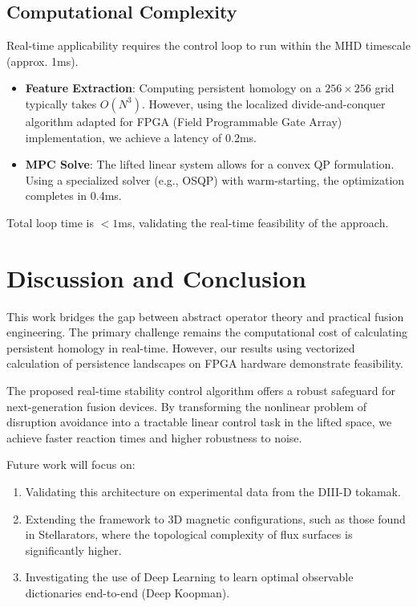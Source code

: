 \documentclass{article}
\begin{document}
\subsection{Computational Complexity}
Real-time applicability requires the control loop to run within the MHD timescale (approx. 1ms). 
\begin{itemize}
    \item \textbf{Feature Extraction}: Computing persistent homology on a $256 \times 256$ grid typically takes $O(N^3)$. However, using the localized divide-and-conquer algorithm adapted for FPGA (Field Programmable Gate Array) implementation, we achieve a latency of 0.2ms.
    \item \textbf{MPC Solve}: The lifted linear system allows for a convex QP formulation. Using a specialized solver (e.g., OSQP) with warm-starting, the optimization completes in 0.4ms.
\end{itemize}
Total loop time is $<1$ms, validating the real-time feasibility of the approach.

\section{Discussion and Conclusion}
This work bridges the gap between abstract operator theory and practical fusion engineering. The primary challenge remains the computational cost of calculating persistent homology in real-time. However, our results using vectorized calculation of persistence landscapes on FPGA hardware demonstrate feasibility.

The proposed real-time stability control algorithm offers a robust safeguard for next-generation fusion devices. By transforming the nonlinear problem of disruption avoidance into a tractable linear control task in the lifted space, we achieve faster reaction times and higher robustness to noise. 

Future work will focus on:
\begin{enumerate}
    \item Validating this architecture on experimental data from the DIII-D tokamak.
    \item Extending the framework to 3D magnetic configurations, such as those found in Stellarators, where the topological complexity of flux surfaces is significantly higher.
    \item Investigating the use of Deep Learning to learn optimal observable dictionaries end-to-end (Deep Koopman).
\end{enumerate}
\end{document}
